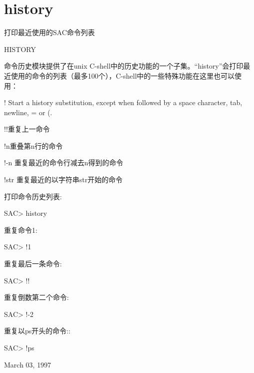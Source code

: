 \section{history}
\label{cmd:history}

打印最近使用的SAC命令列表

HISTORY

命令历史模块提供了在unix C-shell中的历史功能的一个子集。``history''会打印最近使用的命令的列表（最多100个），C-shell中的一些特殊功能在这里也可以使用：

! Start a history substitution, except when followed by a space character, 	tab, newline, = or (.

!!重复上一命令

!n重叠第n行的命令

!-n  重复最近的命令行减去n得到的命令

!str 重复最近的以字符串str开始的命令

打印命令历史列表:
\begin{SACCode}
SAC> history
\end{SACCode}

重复命令1:
\begin{SACCode}
SAC> !1
\end{SACCode}

重复最后一条命令:
\begin{SACCode}
SAC> !!
\end{SACCode}

重复倒数第二个命令:
\begin{SACCode}
SAC> !-2
\end{SACCode}

重复以ps开头的命令::
\begin{SACCode}
SAC> !ps
\end{SACCode}

March 03, 1997
